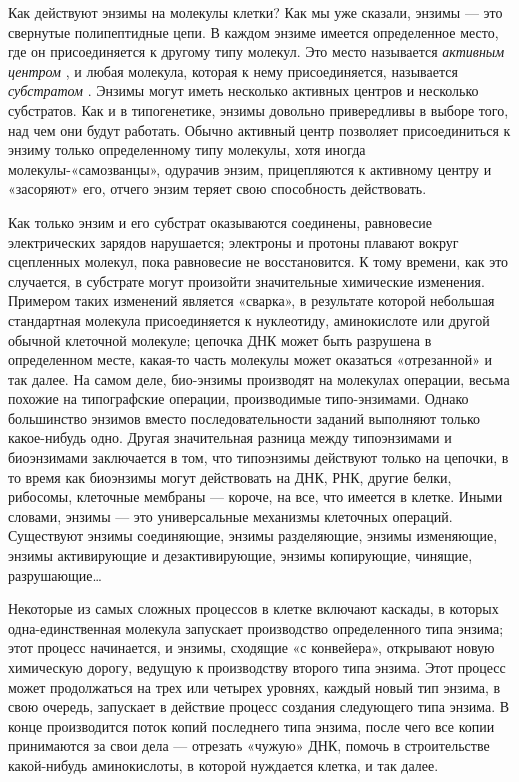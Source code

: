 \documentclass[../main.tex]{subfiles}
\begin{document}
Как действуют энзимы на молекулы клетки? Как мы уже сказали, энзимы --- это свернутые полипептидные цепи. В каждом энзиме имеется определенное место, где он присоединяется к другому типу молекул. Это место называется \emph{активным центром} , и любая молекула, которая к нему присоединяется, называется \emph{субстратом} . Энзимы могут иметь несколько активных центров и несколько субстратов. Как и в типогенетике, энзимы довольно привередливы в выборе того, над чем они будут работать. Обычно активный центр позволяет присоединиться к энзиму только определенному типу молекулы, хотя иногда молекулы-«самозванцы», одурачив энзим, прицепляются к активному центру и «засоряют» его, отчего энзим теряет свою способность действовать.

Как только энзим и его субстрат оказываются соединены, равновесие электрических зарядов нарушается; электроны и протоны плавают вокруг сцепленных молекул, пока равновесие не восстановится. К тому времени, как это случается, в субстрате могут произойти значительные химические изменения. Примером таких изменений является «сварка», в результате которой небольшая стандартная молекула присоединяется к нуклеотиду, аминокислоте или другой обычной клеточной молекуле; цепочка ДНК может быть разрушена в определенном месте, какая-то часть молекулы может оказаться «отрезанной» и так далее. На самом деле, био-энзимы производят на молекулах операции, весьма похожие на типографские операции, производимые типо-энзимами. Однако большинство энзимов вместо последовательности заданий выполняют только какое-нибудь одно. Другая значительная разница между типоэнзимами и биоэнзимами заключается в том, что типоэнзимы действуют только на цепочки, в то время как биоэнзимы могут действовать на ДНК, РНК, другие белки, рибосомы, клеточные мембраны --- короче, на все, что имеется в клетке. Иными словами, энзимы --- это универсальные механизмы клеточных операций. Существуют энзимы соединяющие, энзимы разделяющие, энзимы изменяющие, энзимы активирующие и дезактивирующие, энзимы копирующие, чинящие, разрушающие\ldots{}

Некоторые из самых сложных процессов в клетке включают каскады, в которых одна-единственная молекула запускает производство определенного типа энзима; этот процесс начинается, и энзимы, сходящие «с конвейера», открывают новую химическую дорогу, ведущую к производству второго типа энзима. Этот процесс может продолжаться на трех или четырех уровнях, каждый новый тип энзима, в свою очередь, запускает в действие процесс создания следующего типа энзима. В конце производится поток копий последнего типа энзима, после чего все копии принимаются за свои дела --- отрезать «чужую» ДНК, помочь в строительстве какой-нибудь аминокислоты, в которой нуждается клетка, и так далее.
\end{document}
